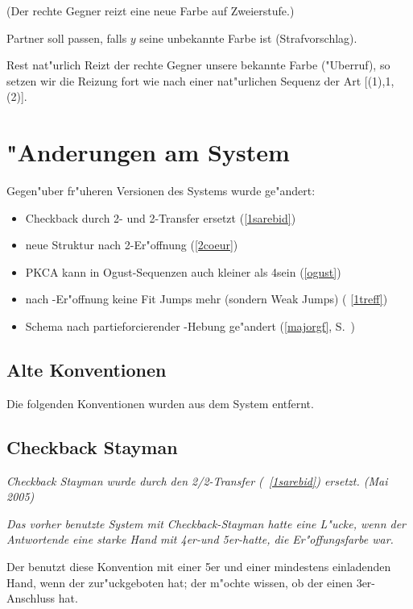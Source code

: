 \begin{appendix}
		(Der rechte Gegner reizt eine neue Farbe auf Zweierstufe.)
		\bdsc
			\item[\kontra] Partner soll passen, falls $y$ seine
unbekannte Farbe ist (Strafvorschlag).
			\item[Rest] nat"urlich
		\edsc
\edsc
Reizt der rechte Gegner unsere bekannte Farbe ("Uberruf), so setzen wir die
Reizung fort wie nach einer nat"urlichen Sequenz der Art
[(1\coe{})\sep1\pik{}\sep(2\pik)].

\section{"Anderungen am System}

Gegen"uber fr"uheren Versionen des Systems wurde ge"andert:

\begin{itemize}
\item Checkback durch 2\tre- und 2\SA-Transfer ersetzt (\ra \ref{1sarebid})
\item neue Struktur nach 2\coe-Er"offnung (\ra \ref{2coeur})
\item PKCA kann in Ogust-Sequenzen auch kleiner als 4\tre sein (\ra \ref{ogust})
\item nach \ufa-Er"offnung keine Fit Jumps mehr (sondern Weak Jumps) (\ra
\ref{1treff})
\item Schema nach partieforcierender \ofa{}-Hebung ge"andert (\ra \ref{majorgf}, S.~\pageref{majorgf})
\end{itemize}

\subsection{Alte Konventionen}

Die folgenden Konventionen wurden aus dem System entfernt.

\subsection*{Checkback Stayman}

\emph{Checkback Stayman wurde durch den 2\tre/2\SA-Transfer (\ra~\ref{1sarebid})
ersetzt. (Mai 2005)}

\emph{Das vorher benutzte System mit Checkback-Stayman hatte eine L"ucke, wenn
der Antwortende eine starke Hand mit 4er-\ofa und 5er-\ufa hatte, die Er"offungsfarbe war.}

Der \aw benutzt diese Konvention mit einer 5er \ofa und einer mindestens
einladenden Hand, wenn der \SA zur"uckgeboten hat; der \aw m"ochte
wissen, ob der \eo einen 3er-Anschluss hat.


\end{appendix}
